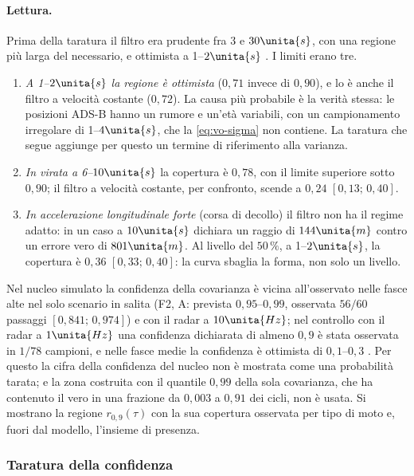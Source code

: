\paragraph{Lettura.} Prima della taratura il filtro era prudente fra $3$ e $30\unita{s}$, con una regione più larga del necessario, e ottimista a 1--$2\unita{s}$ . I limiti erano tre.
\begin{enumerate}[label=\arabic*.]
\item \emph{A 1--$2\unita{s}$ la regione è ottimista} ($0{,}71$ invece di $0{,}90$), e lo è anche il filtro a velocità costante ($0{,}72$). La causa più probabile è la verità stessa: le posizioni ADS-B hanno un rumore e un'età variabili, con un campionamento irregolare di 1--$4\unita{s}$, che la \eqref{eq:vo-sigma} non contiene. La taratura che segue aggiunge per questo un termine di riferimento alla varianza.
\item \emph{In virata a 6--$10\unita{s}$} la copertura è $0{,}78$, con il limite superiore sotto $0{,}90$; il filtro a velocità costante, per confronto, scende a $0{,}24$ $[0{,}13;\,0{,}40]$.
\item \emph{In accelerazione longitudinale forte} (corsa di decollo) il filtro non ha il regime adatto: in un caso a $10\unita{s}$ dichiara un raggio di $144\unita{m}$ contro un errore vero di $801\unita{m}$. Al livello del $50\,\%$, a 1--$2\unita{s}$, la copertura è $0{,}36$ $[0{,}33;\,0{,}40]$: la curva sbaglia la forma, non solo un livello.
\end{enumerate}
Nel nucleo simulato la confidenza della covarianza è vicina all'osservato nelle fasce alte nel solo scenario in salita (F2, A: prevista $0{,}95$--$0{,}99$, osservata $56/60$ passaggi $[0{,}841;\,0{,}974]$) e con il radar a $10\unita{Hz}$; nel controllo con il radar a $1\unita{Hz}$ una confidenza dichiarata di almeno $0{,}9$ è stata osservata in $1/78$ campioni, e nelle fasce medie la confidenza è ottimista di $0{,}1$--$0{,}3$ . Per questo la cifra della confidenza del nucleo non è mostrata come una probabilità tarata; e la zona costruita con il quantile $0{,}99$ della sola covarianza, che ha contenuto il vero in una frazione da $0{,}003$ a $0{,}91$ dei cicli, non è usata. Si mostrano la regione $r_{0,9}(\tau)$ con la sua copertura osservata per tipo di moto e, fuori dal modello, l'insieme di presenza.
\subsubsection{Taratura della confidenza}\label{sec:vo-taratura}

